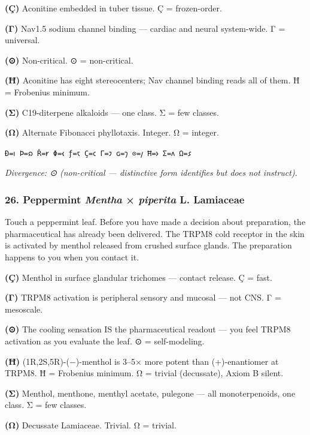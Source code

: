 \documentclass[12pt,a4paper]{article}
\begin{document}
\textbf{(Ç)} Aconitine embedded in tuber tissue. Ç = frozen-order.

\textbf{(Γ)} Nav1.5 sodium channel binding --- cardiac and neural
system-wide. Γ = universal.

\textbf{(⊙)} Non-critical. ⊙ = non-critical.

\textbf{(Ħ)} Aconitine has eight stereocenters; Nav channel binding
reads all of them. Ħ = Frobenius minimum.

\textbf{(Σ)} C19-diterpene alkaloids --- one class. Σ = few classes.

\textbf{(Ω)} Alternate Fibonacci phyllotaxis. Integer. Ω = integer.

\texttt{Ð=𐑦\ Þ=𐑸\ Ř=𐑾\ Φ=𐑬\ ƒ=𐑱\ Ç=𐑤\ Γ=𐑲\ ɢ=𐑠\ ⊙=𐑢\ Ħ=𐑶\ Σ=𐑵\ Ω=𐑭}

\emph{Divergence: ⊙ (non-critical --- distinctive form identifies but
does not instruct).}

\hypertarget{peppermint-mentha-piperita-l.-lamiaceae}{%
\subsubsection{\texorpdfstring{26. Peppermint \textbar{} \emph{Mentha} ×
\emph{piperita} L. \textbar{}
Lamiaceae}{26. Peppermint \textbar{} Mentha × piperita L. \textbar{} Lamiaceae}}\label{peppermint-mentha-piperita-l.-lamiaceae}}

Touch a peppermint leaf. Before you have made a decision about
preparation, the pharmaceutical has already been delivered. The TRPM8
cold receptor in the skin is activated by menthol released from crushed
surface glands. The preparation happens to you when you contact it.

\textbf{(Ç)} Menthol in surface glandular trichomes --- contact release.
Ç = fast.

\textbf{(Γ)} TRPM8 activation is peripheral sensory and mucosal --- not
CNS. Γ = mesoscale.

\textbf{(⊙)} The cooling sensation IS the pharmaceutical readout --- you
feel TRPM8 activation as you evaluate the leaf. ⊙ = self-modeling.

\textbf{(Ħ)} (1R,2S,5R)-(−)-menthol is 3--5× more potent than
(+)-enantiomer at TRPM8. Ħ = Frobenius minimum. Ω = trivial (decussate),
Axiom B silent.

\textbf{(Σ)} Menthol, menthone, menthyl acetate, pulegone --- all
monoterpenoids, one class. Σ = few classes.

\textbf{(Ω)} Decussate Lamiaceae. Trivial. Ω = trivial.
\end{document}
